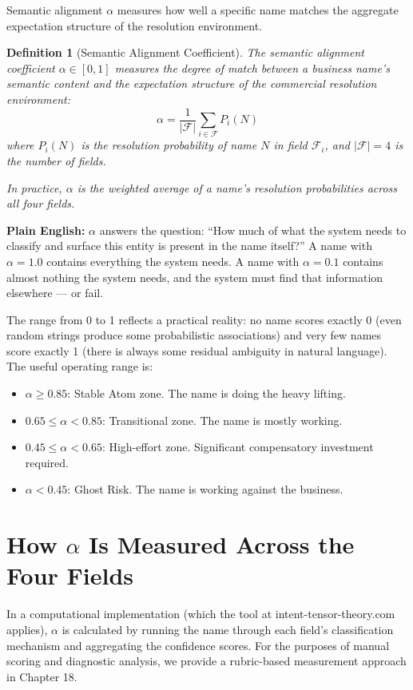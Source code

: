 \documentclass[12pt, openany]{book}
\theoremstyle{thmstyle}
\theoremstyle{defstyle}
\newtheorem{definition}{Definition}[chapter]
\begin{document}
Semantic alignment $\alpha$ measures how well a specific name matches the aggregate expectation structure of the resolution environment.

\begin{definition}[Semantic Alignment Coefficient]
The semantic alignment coefficient $\alpha \in [0, 1]$ measures the degree of match between a business name's semantic content and the expectation structure of the commercial resolution environment:
\[
\alpha = \frac{1}{|\mathcal{F}|} \sum_{i \in \mathcal{F}} P_i(N)
\]
where $P_i(N)$ is the resolution probability of name $N$ in field $\mathcal{F}_i$, and $|\mathcal{F}| = 4$ is the number of fields.

In practice, $\alpha$ is the weighted average of a name's resolution probabilities across all four fields.
\end{definition}

\textbf{Plain English:} $\alpha$ answers the question: ``How much of what the system needs to classify and surface this entity is present in the name itself?'' A name with $\alpha = 1.0$ contains everything the system needs. A name with $\alpha = 0.1$ contains almost nothing the system needs, and the system must find that information elsewhere --- or fail.

The range from 0 to 1 reflects a practical reality: no name scores exactly 0 (even random strings produce some probabilistic associations) and very few names score exactly 1 (there is always some residual ambiguity in natural language). The useful operating range is:

\begin{itemize}[leftmargin=1.5em]
  \item $\alpha \geq 0.85$: Stable Atom zone. The name is doing the heavy lifting.
  \item $0.65 \leq \alpha < 0.85$: Transitional zone. The name is mostly working.
  \item $0.45 \leq \alpha < 0.65$: High-effort zone. Significant compensatory investment required.
  \item $\alpha < 0.45$: Ghost Risk. The name is working against the business.
\end{itemize}

\section{How $\alpha$ Is Measured Across the Four Fields}

In a computational implementation (which the tool at intent-tensor-theory.com applies), $\alpha$ is calculated by running the name through each field's classification mechanism and aggregating the confidence scores. For the purposes of manual scoring and diagnostic analysis, we provide a rubric-based measurement approach in Chapter 18.
\end{document}
